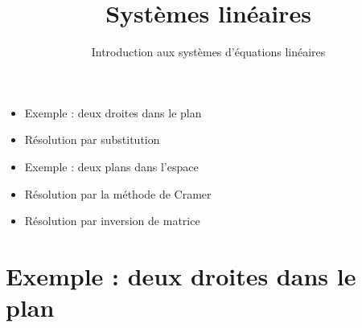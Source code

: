 






\title{{\bf Systèmes linéaires}}
\subtitle{Introduction aux systèmes d'équations linéaires}

\begin{frame}
  
  \debutmontitre

  \pause

{\footnotesize
\hfill
{}
\begin{minipage}{0.6\textwidth}
  \begin{itemize}
    \item<3-> Exemple : deux droites dans le plan
    \item<4-> Résolution par substitution
    \item<5-> Exemple : deux plans dans l'espace
    \item<6-> Résolution par la méthode de Cramer
    \item<7-> Résolution par inversion de matrice  
  \end{itemize}
\end{minipage}
}

\end{frame}

\setcounter{framenumber}{0}


\section{Exemple : deux droites dans le plan}

